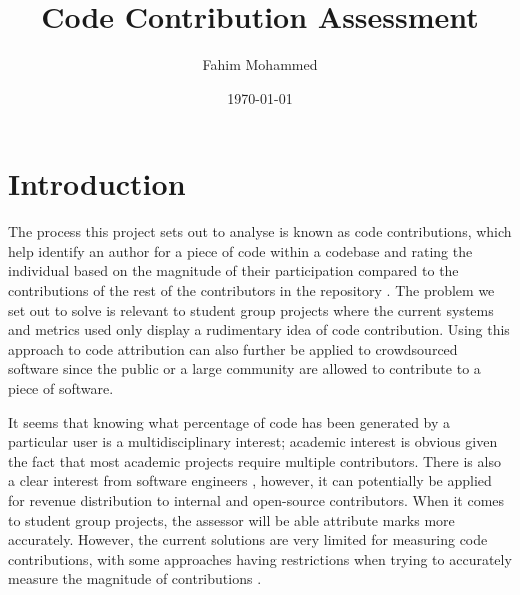 \documentclass[11pt]{informatics-report}
\title{Code Contribution Assessment}
\author{Fahim Mohammed}
\date{\today}
\begin{document}
\createFrontMatter
\onehalfspacing
\tableofcontents
\doublespacing


\chapter{Introduction}
The process this project sets out to analyse is known as code contributions, which help identify an author for a piece of code within a codebase and rating the individual based on the magnitude of their participation compared to the contributions of the rest of the contributors in the repository \citep{10.1007/s10664-017-9575-4}. The problem we set out to solve is relevant to student group projects where the current systems and metrics used only display a rudimentary idea of code contribution. Using this approach to code attribution can also further be applied to crowdsourced software since the public or a large community are allowed to contribute to a piece of software.

It seems that knowing what percentage of code has been generated by a particular user is a multidisciplinary interest; academic interest \citep{kilgour_gray_sallis_macdonell_2012} is obvious given the fact that most academic projects require multiple contributors. There is also a clear interest from software engineers \citep{linares-vasquez_hossen_dang_kagdi_gethers_poshyvanyk_2012}, however, it can potentially be applied for revenue distribution to internal and open-source contributors. When it comes to student group projects, the assessor will be able attribute marks more accurately. However, the current solutions are very limited for measuring code contributions, with some approaches having restrictions when trying to accurately measure the magnitude of contributions \citep{git-author_2013}.
\end{document}

